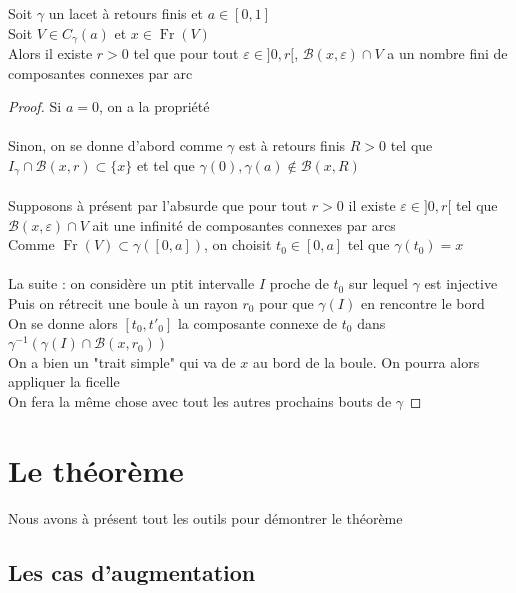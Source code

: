 \documentclass{article}
\begin{document}
\begin{flushleft}
\begin{tcolorbox}[colback = purple!20!white, colframe = purple!60!white, title = Lemme 2]
    Soit $\gamma$ un lacet à retours finis et $a \in [0, 1]$\\
    Soit $V \in C_{\gamma}(a)$ et $x \in \operatorname{Fr}(V)$\\
    Alors il existe $r > 0$ tel que pour tout $\varepsilon \in ]0, r[$, $\mathcal{B}(x, \varepsilon) \cap V$
    a un nombre fini de composantes connexes par arc
\end{tcolorbox}

\begin{proof}
    Si $a = 0$, on a la propriété
    \\~\\
    Sinon, on se donne d'abord comme $\gamma$ est à retours finis $R > 0$ tel que $I_{\gamma} \cap \mathcal{B}(x, r) \subset
    \{ x \}$ et tel que $\gamma(0), \gamma(a) \notin \mathcal{B}(x, R)$
    \\~\\
    Supposons à présent par l'absurde que pour tout $r > 0$ il existe $\varepsilon \in ]0, r[$ tel que
    $\mathcal{B}(x, \varepsilon) \cap V$ ait une infinité de composantes connexes par arcs\\
    Comme $\operatorname{Fr}(V) \subset \gamma([0, a])$, on choisit $t_0 \in [0, a]$ tel que $\gamma(t_0) = x$
    \\~\\
    La suite : on considère un ptit intervalle $I$ proche de $t_0$ sur lequel $\gamma$ est injective\\
    Puis on rétrecit une boule à un rayon $r_0$ pour que $\gamma(I)$ en rencontre le bord\\
    On se donne alors $[t_0, t'_0]$ la composante connexe de $t_0$ dans
    $\gamma^{-1}(\gamma(I) \cap \mathcal{B}(x, r_0))$\\
    On a bien un "trait simple" qui va de $x$ au bord de la boule. On pourra alors appliquer la ficelle\\
    On fera la même chose avec tout les autres prochains bouts de $\gamma$
\end{proof}

\section{Le théorème}

Nous avons à présent tout les outils pour démontrer le théorème

\subsection{Les cas d'augmentation}


\end{flushleft}
\end{document}
